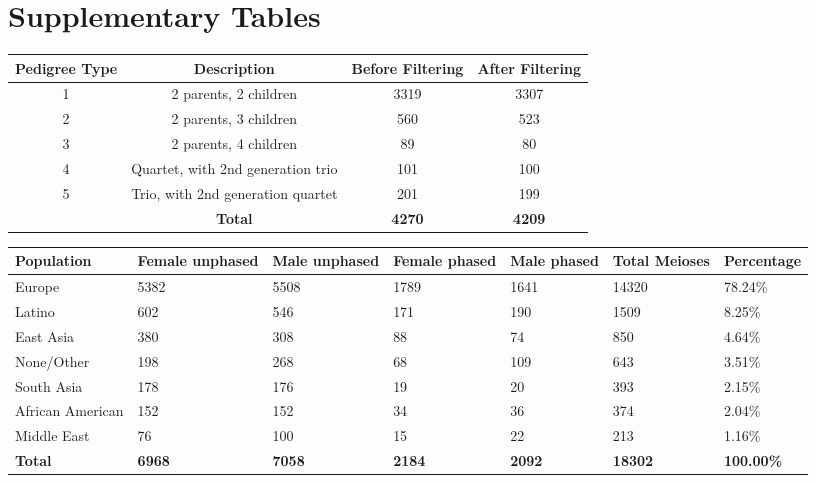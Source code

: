 \clearpage
\section{Supplementary Tables}


\begin{table}[!h] \centering
    \begin{tabular}{|c|c|c|c|} 
        \hline Pedigree Type & Description & Before Filtering & After Filtering \\ \hline
        1 & 2 parents, 2 children & 3319 & 3307 \\
        2 & 2 parents, 3 children & 560 & 523 \\
        3 & 2 parents, 4 children & 89 & 80 \\
        4 & Quartet, with 2nd generation trio & 101 & 100 \\
        5 & Trio, with 2nd generation quartet & 201 & 199 \\
        \hline & \textbf{Total} & \textbf{4270} & \textbf{4209} \\
    \hline \end{tabular}
\end{table}

\begin{table}[!h] \centering
    \begin{tabular}{|p{3cm}p{1.5cm}p{1.5cm}p{1.5cm}p{1.5cm}p{1.5cm}p{2cm}|}
        \hline 
    Population & Female \mbox{unphased} & Male \mbox{unphased} & Female phased & Male phased & Total Meioses & Percentage \\ \hline
    Europe & 5382 & 5508 & 1789 & 1641 & 14320 & 78.24\% \\
    Latino & 602 & 546 & 171 & 190 & 1509 & 8.25\% \\
    East Asia & 380 & 308 & 88 & 74 & 850 & 4.64\% \\
    None/Other & 198 & 268 & 68 & 109 & 643 & 3.51\% \\
    South Asia & 178 & 176 & 19 & 20 & 393 & 2.15\% \\
    African American & 152 & 152 & 34 & 36 & 374 & 2.04\% \\
    Middle East & 76 & 100 & 15 & 22 & 213 & 1.16\% \\
    \hline \textbf{Total} & \textbf{6968} & \textbf{7058} & \textbf{2184} & \textbf{2092} & \textbf{18302} & \textbf{100.00\%} \\
    \hline \end{tabular}
     {
    \label{tab:cointTS2}}
\end{table}

